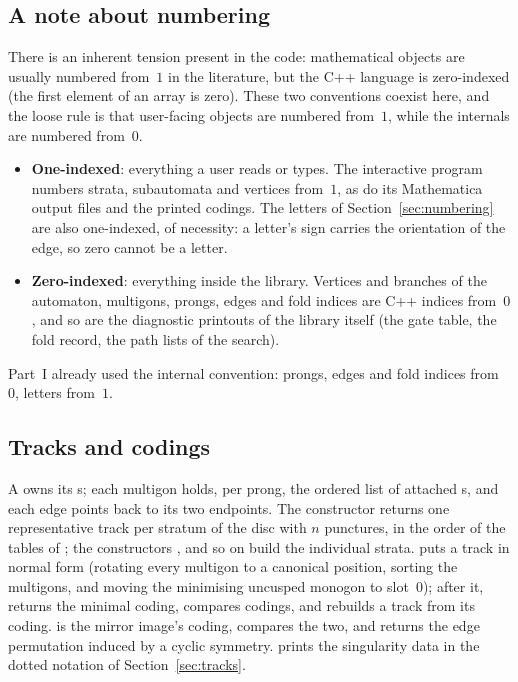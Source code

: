 \documentclass[12pt]{amsart}
\theoremstyle{plain}
\theoremstyle{definition}
\begin{document}
\subsection*{A note about numbering}
There is an inherent tension present in the code: mathematical objects are
usually numbered from~$1$ in the literature, but the C++ language is
zero-indexed (the first element of an array is zero).  These two conventions
coexist here, and the loose rule is that user-facing objects are numbered
from~$1$, while the internals are numbered from~$0$.
\begin{itemize}
  \item \textbf{One-indexed}: everything a user reads or types.  The
    interactive  program numbers strata, subautomata and
    vertices from~$1$, as do its Mathematica output files and the printed
    codings.  The letters of Section~\ref{sec:numbering} are also
    one-indexed, of necessity: a letter's sign carries the orientation of
    the edge, so zero cannot be a letter.
  \item \textbf{Zero-indexed}: everything inside the library.  Vertices
    and branches of the automaton, multigons, prongs, edges and fold
    indices are C++ indices from~$0$, and so are the diagnostic printouts
    of the library itself (the gate table, the fold record, the path lists
    of the search).
\end{itemize}
Part~I already used the internal convention: prongs, edges and fold
indices from~$0$, letters from~$1$.

\subsection{Tracks and codings}
A  owns its s; each multigon holds, per
prong, the ordered list of attached s, and each edge points
back to its two endpoints.  The constructor 
returns one representative track per stratum of the disc with $n$
punctures, in the order of the tables of \cite{Lanneau2011}; the
constructors ,  and so on build
the individual strata.   puts a track in normal form
(rotating every multigon to a canonical position, sorting the multigons,
and moving the minimising uncusped monogon to slot~$0$); after it,
 returns the minimal coding,  compares
codings, and  rebuilds a track from its coding.
 is the mirror image's coding, 
compares the two, and  returns the edge
permutation induced by a cyclic symmetry.  
prints the singularity data in the dotted notation of
Section~\ref{sec:tracks}.
\end{document}
